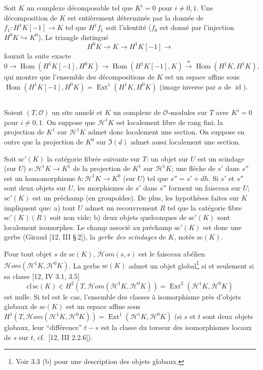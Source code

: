 \documentclass[12pt,a4paper]{article}
\theoremstyle{plain}
\theoremstyle{definition}
\theoremstyle{remark}
\DeclareMathOperator{\Hom}{Hom}
\DeclareMathOperator{\Ext}{Ext}
\DeclareMathOperator{\id}{id}
\newcommand{\cO}{\mathcal{O}}
\begin{document}
Soit $K$ un complexe d\'ecomposable tel que $K^i = 0$ pour $i \neq 0, 1$. Une d\'ecomposition de $K$ est enti\`erement d\'etermin\'ee par la donn\'ee de $f_1: H^1 K[-1] \to K$ tel que $H^1 f_1$ soit l'identit\'e ($f_0$ est donn\'e par l'injection $H^0 K \hookrightarrow K^0$). Le triangle distingu\'e
\[
H^0 K \to K \to H^1 K[-1] \to
\]
fournit la suite exacte
\[
0 \to \Hom(H^1 K[-1], H^0 K) \to \Hom(H^1 K[-1], K) \xrightarrow{a} \Hom(H^1 K, H^1 K),
\]
qui montre que l'ensemble des d\'ecompositions de $K$ est un espace affine sous $\Hom(H^1 K[-1], H^0 K) = \Ext^1(H^1 K, H^0 K)$ (image inverse par $a$ de $\id$).

\subsection{}

Soient $(T, \cO)$ un site annel\'e et $K$ un complexe de $\cO$-modules sur $T$ avec $K^i = 0$ pour $i \neq 0, 1$. On suppose que $\mathscr{H}^1 K$ est localement libre de rang fini; la projection de $K^1$ sur $\mathscr{H}^1 K$ admet donc localement une section. On suppose en outre que la projection de $K^0$ sur $\Im(d)$ admet aussi localement une section.

Soit $\mathrm{sc}'(K)$ la cat\'egorie fibr\'ee suivante sur $T$: un objet sur $U$ est un scindage (sur $U$) $s: \mathscr{H}^1 K \to K^1$ de la projection de $K^1$ sur $\mathscr{H}^1 K$; une fl\`eche de $s'$ dans $s''$ est un homomorphisme $h: \mathscr{H}^1 K \to K^0$ (sur $U$) tel que $s'' = s' + dh$. Si $s'$ et $s''$ sont deux objets sur $U$, les morphismes de $s'$ dans $s''$ forment un faisceau sur $U$; $\mathrm{sc}'(K)$ est un pr\'echamp (en groupo\"ides). De plus, les hypoth\`eses faites sur $K$ impliquent que: a) tout $U$ admet un recouvrement $R$ tel que la cat\'egorie fibre $\mathrm{sc}'(K)(R)$ soit non vide; b) deux objets quelconques de $\mathrm{sc}'(K)$ sont localement isomorphes. Le champ associ\'e au pr\'echamp $\mathrm{sc}'(K)$ est donc une gerbe (Giraud [12, III \S\,2]), la \emph{gerbe des scindages} de $K$, not\'ee $\mathrm{sc}(K)$.

Pour tout objet $s$ de $\mathrm{sc}(K)$, $\mathscr{H}om(s,s)$ est le faisceau ab\'elien $\mathscr{H}om(\mathscr{H}^1 K, \mathscr{H}^0 K)$. La gerbe $\mathrm{sc}(K)$ admet un objet global\footnote{Voir 3.3 (b) pour une description des objets globaux.} si et seulement si sa classe [12, IV 3.1, 3.5]
\[
\mathrm{cl}\, \mathrm{sc}(K) \in H^2(T, \mathscr{H}om(\mathscr{H}^1 K, \mathscr{H}^0 K)) = \Ext^2(\mathscr{H}^1 K, \mathscr{H}^0 K)
\]
est nulle. Si tel est le cas, l'ensemble des classes \`a isomorphisme pr\`es d'objets globaux de $\mathrm{sc}(K)$ est un espace affine sous $H^1(T, \mathscr{H}om(\mathscr{H}^1 K, \mathscr{H}^0 K)) = \Ext^1(\mathscr{H}^1 K, \mathscr{H}^0 K)$ (si $s$ et $t$ sont deux objets globaux, leur ``diff\'erence'' $t - s$ est la classe du torseur des isomorphismes locaux de $s$ sur $t$, cf.~[12, III 2.2.6]).
\end{document}
